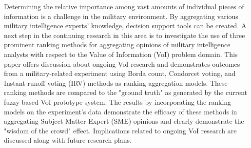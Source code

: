 Determining the relative importance among vast amounts of individual pieces of information is a challenge in the military environment. By aggregating various military intelligence experts' knowledge, decision support tools can be created. A next step in the continuing research in this area is to investigate the use of three prominent ranking methods for aggregating opinions of military intelligence analysts with respect to the Value of Information (VoI) problem domain. This paper offers discussion about ongoing VoI research and demonstrates outcomes from a military-related experiment using Borda count, Condorcet voting, and Instant-runoff voting (IRV) methods as ranking aggregation models. These ranking methods are compared to the "ground truth" as generated by the current fuzzy-based VoI prototype system. The results by incorporating the ranking models on the experiment's data demonstrate the efficacy of these methods in aggregating Subject Matter Expert (SME) opinions and clearly demonstrate the "wisdom of the crowd" effect. Implications related to ongoing VoI research are discussed along with future research plans.
